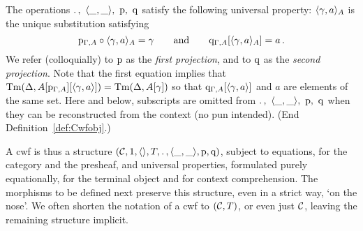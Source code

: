 \documentclass{mscs}
\begin{document}
\begin{definition}
The operations  ${.\,},~\langle \_,\_ \rangle,~\mathrm{p},~\mathrm{q}$
satisfy the following universal property:
$\langle \gamma, a \rangle_A$ is the unique substitution satisfying
\[
\mathrm{p}_{\Gamma, A} \circ \langle \gamma, a \rangle_A = \gamma
\qquad \text{and}\qquad
\mathrm{q}_{\Gamma, A} [\langle \gamma, a \rangle_A] = a\,.
\]
We refer (colloquially) to $\mathrm{p}$ as the \emph{first projection},
and to $\mathrm{q}$ as the \emph{second projection}. %
{Note that the first equation implies that
$\mathrm{Tm}(\Delta,A[\mathrm{p}_{\Gamma,A}][\langle \gamma, a \rangle]) = \mathrm{Tm}(\Delta,A[\gamma])$
so that $\mathrm{q}_{\Gamma, A} [\langle \gamma, a \rangle]$ and $a$ are elements of the same set.}
Here and below, subscripts are omitted from ${.\,},~\langle \_,\_ \rangle,~\mathrm{p},~\mathrm{q}$
when they can be reconstructed from the context (no pun intended).
(End Definition~\ref{def:Cwfobj}.)
\end{definition}

A cwf is thus a structure $({\mathcal C},1,\langle  \rangle,T,.\, , \langle \_,\_ \rangle,\mathrm{p}, \mathrm{q})$,
subject to equations, for the category and the presheaf, and universal
properties, formulated purely equationally, for the terminal object and for context comprehension.
The morphisms to be defined next preserve this structure,
even in a strict way, `on the nose'.
We often shorten the notation of a cwf to $({\mathcal C},T)$, or even just ${\mathcal C}$,
leaving the remaining structure implicit.
\end{document}
